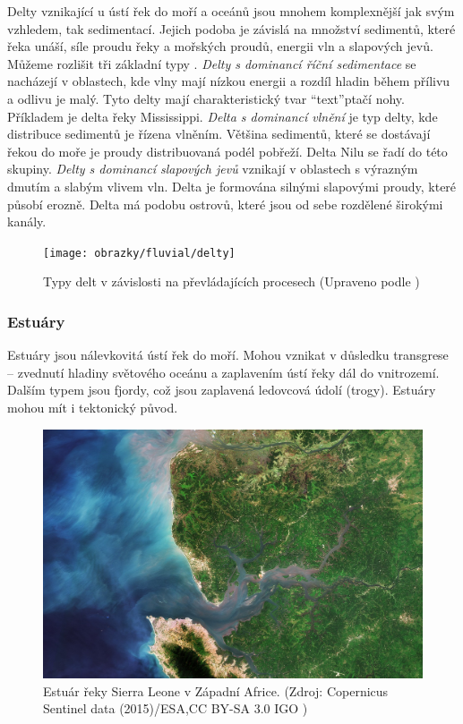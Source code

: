 Delty vznikající u ústí řek do moří a oceánů jsou mnohem komplexnější jak svým vzhledem, tak sedimentací. Jejich podoba je závislá na množství sedimentů, které řeka unáší, síle proudu řeky a mořských proudů, energii vln a slapových jevů. Můžeme rozlišit tři základní typy \parencite{boggsPrinciplesSedimentologyStratigraphy2014}. \emph{Delty s dominancí říční sedimentace} se nacházejí v oblastech, kde vlny mají nízkou energii a rozdíl hladin během přílivu a odlivu je malý. Tyto delty mají charakteristický tvar \enquote{text}{ptačí nohy}. Příkladem je delta řeky Mississippi. \emph{Delta s dominancí vlnění} je typ delty, kde distribuce sedimentů je řízena vlněním. Většina sedimentů, které se dostávají řekou do moře je proudy distribuovaná podél pobřeží. Delta Nilu se řadí do této skupiny. \emph{Delty s dominancí slapových jevů} vznikají v oblastech s výrazným dmutím a slabým vlivem vln. Delta je formována silnými slapovými proudy, které působí erozně. Delta má podobu ostrovů, které jsou od sebe rozdělené širokými kanály.

\begin{figure}[h]
	\centering
	\texttt{[image: obrazky/fluvial/delty]}
	\caption{Typy delt v závislosti na převládajících procesech (Upraveno podle \textcite{seyboldModelingRiverDelta2007})}
	\label{fig:delty}
\end{figure}

\subsubsection{Estuáry}
Estuáry jsou nálevkovitá ústí řek do moří. Mohou vznikat v důsledku transgrese -- zvednutí hladiny světového oceánu a zaplavením ústí řeky dál do vnitrozemí. Dalším typem jsou fjordy, což jsou zaplavená ledovcová údolí (trogy). Estuáry mohou mít i tektonický původ. 

\begin{figure}[h]
	\centering
	\includegraphics[width=1\linewidth]{obrazky/marine/estuary}
	\caption{Estuár řeky Sierra Leone v Západní Africe. (Zdroj: Copernicus Sentinel data (2015)/ESA,CC BY-SA 3.0 IGO )}
	\label{fig:estuary}
\end{figure}

